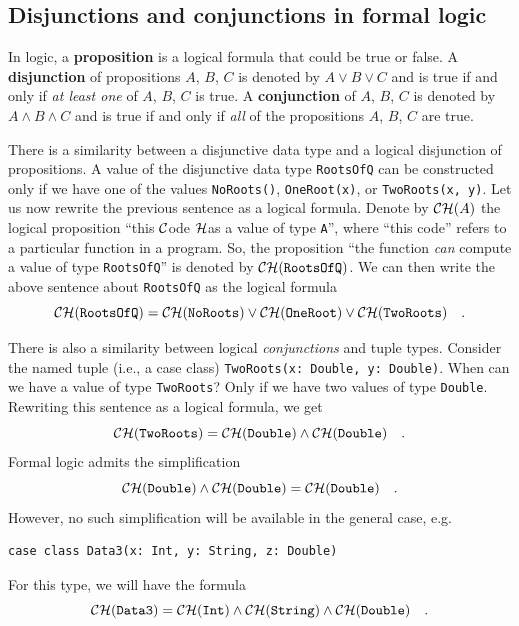 \subsection{Disjunctions and conjunctions in formal logic\label{subsec:Disjunctions-and-conjunctions}}

In logic, a \textbf{proposition} is
a logical formula that could be true or false. A \textbf{disjunction}
of propositions $A$, $B$, $C$ is denoted by $A\vee B\vee C$ and
is true if and only if \emph{at least one} of $A$, $B$, $C$ is
true. A \textbf{conjunction} of $A$,
$B$, $C$ is denoted by $A\wedge B\wedge C$ and is true if and only
if \emph{all} of the propositions $A$, $B$, $C$ are true.

There is a similarity between a disjunctive data type and a logical
disjunction of propositions. A value of the disjunctive data type
\lstinline!RootsOfQ! can be constructed only if we have one of the
values \lstinline!NoRoots()!, \lstinline!OneRoot(x)!, or \lstinline!TwoRoots(x, y)!.
Let us now rewrite the previous sentence as a logical formula. Denote
by ${\cal CH}(A)$ the logical proposition ``this ${\cal C}$ode
${\cal H}$as a value of type \lstinline!A!'', where ``this code''
refers to a particular function in a program. So, the proposition
``the function \emph{can} compute a value of type \lstinline!RootsOfQ!''
is denoted by ${\cal CH}(\text{\texttt{RootsOfQ}})$. We can then
write the above sentence about \lstinline!RootsOfQ! as the logical
formula
\begin{equation}
{\cal CH}(\text{\texttt{RootsOfQ}})={\cal CH}(\text{\texttt{NoRoots}})\vee{\cal CH}(\text{\texttt{OneRoot}})\vee{\cal CH}(\text{\texttt{TwoRoots}})\quad.\label{eq:curry-howard-example-disjunction}
\end{equation}

There is also a similarity between logical \emph{conjunctions} and
tuple types. Consider the named tuple (i.e., a case class) \lstinline!TwoRoots(x: Double, y: Double)!.
When can we have a value of type \lstinline!TwoRoots!? Only if we
have two values of type \lstinline!Double!. Rewriting this sentence
as a logical formula, we get
\[
{\cal CH}(\text{\texttt{TwoRoots}})={\cal CH}(\text{\texttt{Double}})\wedge{\cal CH}(\text{\texttt{Double}})\quad.
\]
Formal logic admits the simplification
\[
{\cal CH}(\text{\texttt{Double}})\wedge{\cal CH}(\text{\texttt{Double}})={\cal CH}(\text{\texttt{Double}})\quad.
\]
However, no such simplification will be available in the general case,
e.g.
\begin{lstlisting}
case class Data3(x: Int, y: String, z: Double)
\end{lstlisting}
For this type, we will have the formula 
\begin{equation}
{\cal CH}(\text{\texttt{Data3}})={\cal CH}(\text{\texttt{Int}})\wedge{\cal CH}(\text{\texttt{String}})\wedge{\cal CH}(\text{\texttt{Double}})\quad.\label{eq:curry-howard-example-case-class}
\end{equation}

